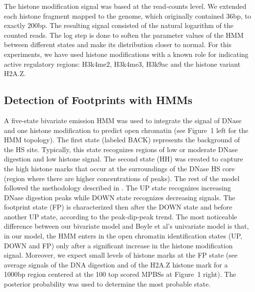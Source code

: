 \documentclass[runningheads,a4paper]{llncs}
\begin{document}
The histone modification signal was based at the read-counts level. We
extended each histone fragment mapped to the genome, which originally
contained 36bp, to exactly 200bp. The resulting signal consisted of
the natural logarithm of the counted reads. The log step is done to
soften the parameter values of the HMM between different states and
make its distribution closer to normal. For this experiments, we have
used histone modifications with a known role for indicating active
regulatory regions: H3k4me2, H3k4me3, H3k9ac and the histone variant
H2A.Z.

\subsection{Detection of Footprints with HMMs\label{sc:hmm}}

A five-state bivariate emission HMM was used to integrate the signal
of DNase and one histone modification to predict open chromatin (see
Figure~1 left for the HMM topology). The first state (labeled BACK)
represents the background of the HS site. Typically, this state
recognizes regions of low or moderate DNase digestion and low histone
signal. The second state (HH) was created to capture the high histone
marks that occur at the surroundings of the DNase HS core (region
where there are higher concentrations of peaks). The rest of the model
followed the methodology described in \cite{boyle2011}. The UP state
recognizes increasing DNase digestion peaks while DOWN state
recognizes decreasing signals. The footprint state (FP) is
characterized then after the DOWN state and before another UP state,
according to the peak-dip-peak trend. The most noticeable difference
between our bivariate model and Boyle et al's univariate model is that, in our model, the HMM enters in
the open chromatin identification states (UP, DOWN and FP) only after
a significant increase in the histone modification signal. Moreover,
we expect small levels of histone marks at the FP state (see average
signals of the DNA digestion and of the H2A.Z histone mark for a 1000bp 
region centered at the 100 top scored MPBSs at Figure~1 right). The posterior 
probability was used to determine the most probable state.
\end{document}
